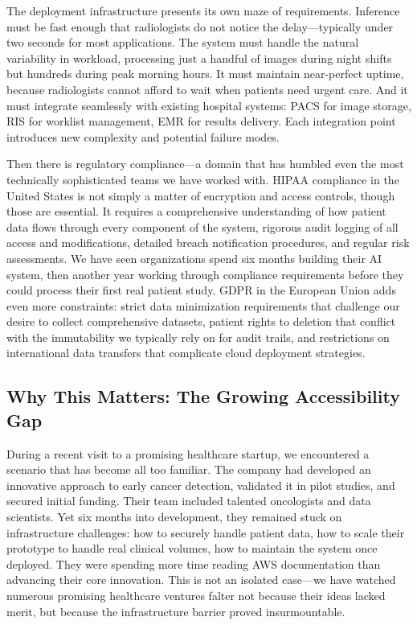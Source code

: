 \documentclass[12pt,a4paper]{article}
\begin{document}
The deployment infrastructure presents its own maze of requirements. Inference must be fast enough that radiologists do not notice the delay—typically under two seconds for most applications. The system must handle the natural variability in workload, processing just a handful of images during night shifts but hundreds during peak morning hours. It must maintain near-perfect uptime, because radiologists cannot afford to wait when patients need urgent care. And it must integrate seamlessly with existing hospital systems: PACS for image storage, RIS for worklist management, EMR for results delivery. Each integration point introduces new complexity and potential failure modes.

Then there is regulatory compliance—a domain that has humbled even the most technically sophisticated teams we have worked with. HIPAA compliance in the United States is not simply a matter of encryption and access controls, though those are essential. It requires a comprehensive understanding of how patient data flows through every component of the system, rigorous audit logging of all access and modifications, detailed breach notification procedures, and regular risk assessments. We have seen organizations spend six months building their AI system, then another year working through compliance requirements before they could process their first real patient study. GDPR in the European Union adds even more constraints: strict data minimization requirements that challenge our desire to collect comprehensive datasets, patient rights to deletion that conflict with the immutability we typically rely on for audit trails, and restrictions on international data transfers that complicate cloud deployment strategies.

\subsection{Why This Matters: The Growing Accessibility Gap}

During a recent visit to a promising healthcare startup, we encountered a scenario that has become all too familiar. The company had developed an innovative approach to early cancer detection, validated it in pilot studies, and secured initial funding. Their team included talented oncologists and data scientists. Yet six months into development, they remained stuck on infrastructure challenges: how to securely handle patient data, how to scale their prototype to handle real clinical volumes, how to maintain the system once deployed. They were spending more time reading AWS documentation than advancing their core innovation. This is not an isolated case—we have watched numerous promising healthcare ventures falter not because their ideas lacked merit, but because the infrastructure barrier proved insurmountable.
\end{document}
